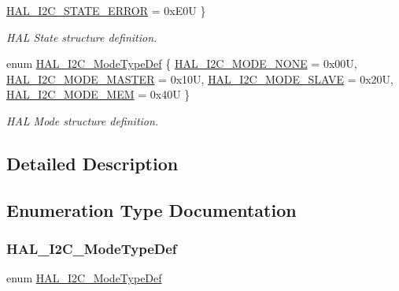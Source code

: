 \begin{DoxyCompactItemize}
\mbox{\hyperlink{group___i2_c___exported___types_ggaef355af8eab251ae2a19ee164ad81c37afe3c9b304462901099426a0d414be2a2}{H\+A\+L\+\_\+\+I2\+C\+\_\+\+S\+T\+A\+T\+E\+\_\+\+E\+R\+R\+OR}} = 0x\+E0U
 \}
\begin{DoxyCompactList}\small\item\em H\+AL State structure definition. \end{DoxyCompactList}\item 
enum \mbox{\hyperlink{group___i2_c___exported___types_gabcbb7b844f2ffd63c4e530c117882062}{H\+A\+L\+\_\+\+I2\+C\+\_\+\+Mode\+Type\+Def}} \{ \mbox{\hyperlink{group___i2_c___exported___types_ggabcbb7b844f2ffd63c4e530c117882062a98c8fd642b7ac45a23479bd597fc7a71}{H\+A\+L\+\_\+\+I2\+C\+\_\+\+M\+O\+D\+E\+\_\+\+N\+O\+NE}} = 0x00U, 
\mbox{\hyperlink{group___i2_c___exported___types_ggabcbb7b844f2ffd63c4e530c117882062a1eea98660a170dd7b191c9dfe46da6d2}{H\+A\+L\+\_\+\+I2\+C\+\_\+\+M\+O\+D\+E\+\_\+\+M\+A\+S\+T\+ER}} = 0x10U, 
\mbox{\hyperlink{group___i2_c___exported___types_ggabcbb7b844f2ffd63c4e530c117882062a817358d19d278261f2047a5ec8ec6b53}{H\+A\+L\+\_\+\+I2\+C\+\_\+\+M\+O\+D\+E\+\_\+\+S\+L\+A\+VE}} = 0x20U, 
\mbox{\hyperlink{group___i2_c___exported___types_ggabcbb7b844f2ffd63c4e530c117882062a3f592bd942f973242aac6b7df79f3f1e}{H\+A\+L\+\_\+\+I2\+C\+\_\+\+M\+O\+D\+E\+\_\+\+M\+EM}} = 0x40U
 \}
\begin{DoxyCompactList}\small\item\em H\+AL Mode structure definition. \end{DoxyCompactList}\end{DoxyCompactItemize}


\subsection{Detailed Description}


\subsection{Enumeration Type Documentation}
\mbox{\label{group___i2_c___exported___types_gabcbb7b844f2ffd63c4e530c117882062}} 
\subsubsection{\texorpdfstring{H\+A\+L\+\_\+\+I2\+C\+\_\+\+Mode\+Type\+Def}{HAL\_I2C\_ModeTypeDef}}
{\footnotesize\ttfamily enum \mbox{\hyperlink{group___i2_c___exported___types_gabcbb7b844f2ffd63c4e530c117882062}{H\+A\+L\+\_\+\+I2\+C\+\_\+\+Mode\+Type\+Def}}}



